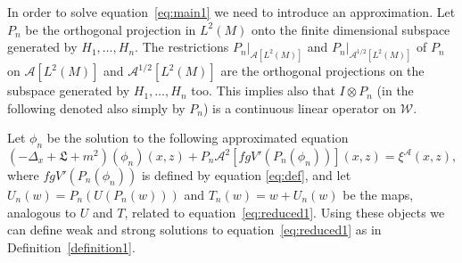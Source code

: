 \documentclass[a4paper,10pt]{article}
\newcommand{\nobracket}{}
\begin{document}
In order to solve equation~{\eqref{eq:main1}} we need to introduce an
approximation. Let $P_n$ be the orthogonal projection in $L^2 (M)$ onto the
finite dimensional subspace generated by $H_1, \ldots, H_n$. The restrictions
$\nobracket P_n |_{\mathcal{A} [L^2 (M)]}$ and $\nobracket P_n
|_{\mathcal{A}^{1 / 2} [L^2 (M)]}$ of $P_n$ on $\mathcal{A} [L^2 (M)]$ and
$\mathcal{A}^{1 / 2} [L^2 (M)]$ are the orthogonal projections on the subspace
generated by $H_1, \ldots, H_n$ too. This implies also that $I \otimes P_n$
(in the following denoted also simply by $P_n$) is a continuous linear
operator on $\mathcal{W}$.

Let $\phi_n$ be the solution to the following approximated equation
\begin{equation}
  (- \Delta_x + \mathfrak{L} + m^2) (\phi_n) (x, z) + P_n \mathcal{A}^2 [f g V' (P_n (\phi_n))] (x, z) =   \xi^{\mathcal{A}} (x, z) , \label{eq:reduced1}
\end{equation}
where $f g V' (P_n (\phi_n))$ is defined by equation \eqref{eq:def}, and let $U_n (w) = P_n (U (P_n (w)))$ and $T_n (w) = w + U_n (w)$ be the maps,
analogous to $U$ and $T$, related to equation~{\eqref{eq:reduced1}}. Using
these objects we can define weak and strong solutions to
equation~{\eqref{eq:reduced1}} as in Definition~\ref{definition1}.

\
\end{document}
